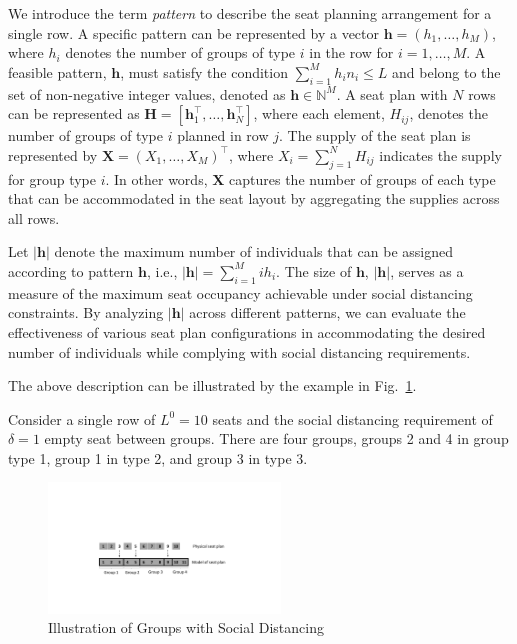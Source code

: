 We introduce the term \textit{pattern} to describe the seat planning arrangement for a single row. A specific pattern can be represented by a vector $\bm{h} = (h_1, \ldots, h_M)$, where $h_i$ denotes the number of groups of type $i$ in the row for $i = 1,\ldots, M$. A feasible pattern, $\bm{h}$, must satisfy the condition $\sum_{i=1}^{M} h_i n_i \leq L$ and belong to the set of non-negative integer values, denoted as $\bm{h} \in \mathbb{N}^{M}$. A seat plan with $N$ rows can be represented as $\bm{H} = [\bm{h}_{1}^{\intercal}, \ldots, \bm{h}_{N}^{\intercal}]$, where each element, $H_{ij}$, denotes the number of groups of type $i$ planned in row $j$. The supply of the seat plan is represented by $\bm{X} = (X_{1}, \ldots, X_{M})^{\intercal}$, where $X_i= \sum_{j=1}^{N} H_{ij}$ indicates the supply for group type $i$. In other words, $\bm{X}$ captures the number of groups of each type that can be accommodated in the seat layout by aggregating the supplies across all rows.

Let $|\bm{h}|$ denote the maximum number of individuals that can be assigned according to pattern $\bm{h}$, i.e., $|\bm{h}| = \sum_{i =1}^{M} i h_i$. The size of $\bm{h}$, $|\bm{h}|$, serves as a measure of the maximum seat occupancy achievable under social distancing constraints. By analyzing $|\bm{h}|$ across different patterns, we can evaluate the effectiveness of various seat plan configurations in accommodating the desired number of individuals while complying with social distancing requirements.

The above description can be illustrated by the example in Fig.~\ref{fex1}.

\begin{example}
Consider a single row of $L^0=10$ seats and the social distancing requirement of $\delta = 1$ empty seat between groups. There are four groups, groups 2 and 4 in group type 1, group 1 in type 2, and group 3 in type 3.
\end{example}

\begin{figure}[ht]
    \centering
        \includegraphics[width=0.55\textwidth]{./Figures/model_plan.pdf}
    \caption{Illustration of Groups with Social Distancing}\label{fex1}
\end{figure}


